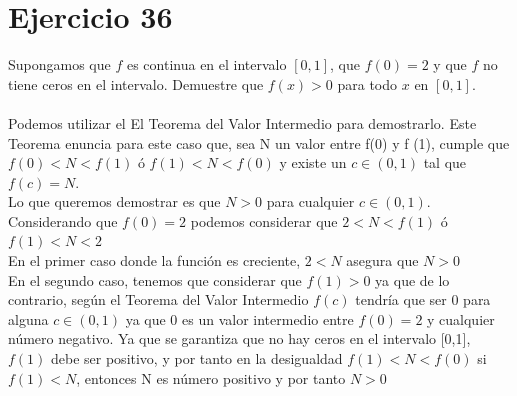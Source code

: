 \documentclass[12pt]{article}
\begin{document}
\section{Ejercicio 36}
Supongamos que $f$ es continua en el intervalo $[0, 1]$, que $f(0) = 2$ y que $f$ no tiene ceros en el intervalo. Demuestre que $f(x) > 0$ para todo $x$ en $[0, 1]$.\\ \\

Podemos utilizar el El Teorema del Valor Intermedio para demostrarlo. Este Teorema enuncia para este caso que, sea N un valor entre f(0) y f (1), cumple que $f(0)<N<f(1)$ ó $f(1)<N<f(0)$ y existe un $c \in (0, 1)$ tal que $f(c) = N$.\\
Lo que queremos demostrar es que $N>0$ para cualquier $c \in (0, 1)$. \\
Considerando que $f(0) = 2 $ podemos considerar que $2<N<f(1)$ ó $f(1)<N<2$  \\
En el primer caso donde la función es creciente, $2<N$ asegura que $N>0$ \\
En el segundo caso, tenemos que considerar que $f(1)>0$ ya que de lo contrario, según el Teorema del Valor Intermedio $f(c)$ tendría que ser $0$ para alguna $c \in (0, 1)$ ya que 0 es un valor intermedio entre $f(0) = 2$ y cualquier número negativo. Ya que se garantiza que no hay ceros en el intervalo [0,1], $f(1)$ debe ser positivo, y por tanto en la desigualdad  $f(1)<N<f(0)$ si $f(1)<N$, entonces N es número positivo y por tanto $N>0$
\end{document}
